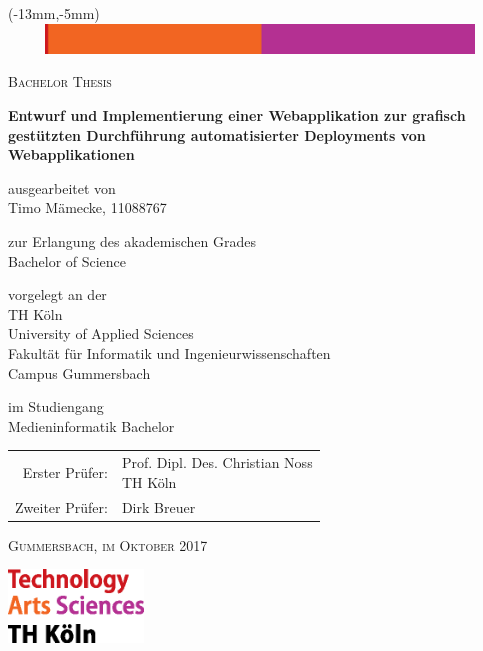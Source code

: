 \begin{titlepage}
  \enlargethispage{5cm}

  \begin{textblock*}{230mm}(-13mm,-5mm)
    \includegraphics[width=230mm,height=8mm]{./assets/topline.eps}
  \end{textblock*}


  \begin{center}
    \textsc{\Large{Bachelor Thesis}}

    \vspace{1cm}

    \LARGE{\textbf{Entwurf und Implementierung einer Webapplikation zur grafisch gestützten Durchführung automatisierter Deployments von Webapplikationen}}

    \vspace{1cm}

    \normalsize{ausgearbeitet von} \\
    \Large{Timo Mämecke, 11088767}

    \normalsize{zur Erlangung des akademischen Grades} \\
    \Large{Bachelor of Science}

    \normalsize{vorgelegt an der} \\
    \Large{TH Köln}\\
    \Large{University of Applied Sciences}\\
    \Large{Fakultät für Informatik und Ingenieurwissenschaften}\\
    \Large{Campus Gummersbach}

    \normalsize{im Studiengang} \\
    \Large{Medieninformatik Bachelor}

    \vspace{1cm}

    \large{
      \begin{tabular}{ r l }
        Erster Prüfer: & \makecell[lt]{Prof. Dipl. Des. Christian Noss\\\small{TH Köln}\vspace{0.2cm}} \\
        Zweiter Prüfer: & Dirk Breuer
      \end{tabular}
    }

    \vspace{1cm}

    \textsc{Gummersbach, im Oktober 2017}

  \end{center}

  \vspace{\fill}

  \begin{flushright}
    \includegraphics[height=55pt]{./assets/logo_th-koeln.eps}
  \end{flushright}
\end{titlepage}
